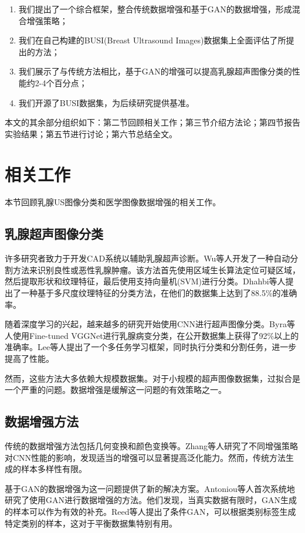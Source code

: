 \documentclass[supercite]{../Hust-undergraduate-translation/Experimental_Report}
\theoremstyle{definition}
\begin{document}
\begin{enumerate}
\item 我们提出了一个综合框架，整合传统数据增强和基于GAN的数据增强，形成混合增强策略；
\item 我们在自己构建的BUSI(Breast Ultrasound Images)数据集上全面评估了所提出的方法；
\item 我们展示了与传统方法相比，基于GAN的增强可以提高乳腺超声图像分类的性能约2-4个百分点；
\item 我们开源了BUSI数据集，为后续研究提供基准。
\end{enumerate}

本文的其余部分组织如下：第二节回顾相关工作；第三节介绍方法论；第四节报告实验结果；第五节进行讨论；第六节总结全文。

\section{相关工作}

本节回顾乳腺US图像分类和医学图像数据增强的相关工作。

\subsection{乳腺超声图像分类}

许多研究者致力于开发CAD系统以辅助乳腺超声诊断。Wu等人开发了一种自动分割方法来识别良性或恶性乳腺肿瘤。该方法首先使用区域生长算法定位可疑区域，然后提取形状和纹理特征，最后使用支持向量机(SVM)进行分类。Dhahbi等人提出了一种基于多尺度纹理特征的分类方法，在他们的数据集上达到了88.5\%的准确率。

随着深度学习的兴起，越来越多的研究开始使用CNN进行超声图像分类。Byra等人使用Fine-tuned VGGNet进行乳腺病变分类，在公开数据集上获得了92\%以上的准确率。Lee等人提出了一个多任务学习框架，同时执行分类和分割任务，进一步提高了性能。

然而，这些方法大多依赖大规模数据集。对于小规模的超声图像数据集，过拟合是一个严重的问题。数据增强是缓解这一问题的有效策略之一。

\subsection{数据增强方法}

传统的数据增强方法包括几何变换和颜色变换等。Zhang等人研究了不同增强策略对CNN性能的影响，发现适当的增强可以显著提高泛化能力。然而，传统方法生成的样本多样性有限。

基于GAN的数据增强为这一问题提供了新的解决方案。Antoniou等人首次系统地研究了使用GAN进行数据增强的方法。他们发现，当真实数据有限时，GAN生成的样本可以作为有效的补充。Reed等人提出了条件GAN，可以根据类别标签生成特定类别的样本，这对于平衡数据集特别有用。
\end{document}
